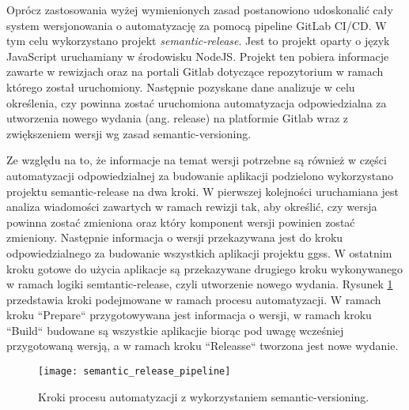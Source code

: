 Oprócz zastosowania wyżej wymienionych zasad postanowiono udoskonalić cały system wersjonowania o automatyzację za pomocą pipeline GitLab CI/CD. W tym celu wykorzystano projekt \emph{semantic-release}. Jest to projekt oparty o język JavaScript uruchamiany w środowisku NodeJS. Projekt ten pobiera informacje zawarte w rewizjach oraz na portali Gitlab dotyczące repozytorium w ramach którego został uruchomiony. Następnie pozyskane dane analizuje w celu określenia, czy powinna zostać uruchomiona automatyzacja odpowiedzialna za utworzenia nowego wydania (ang. release) na platformie Gitlab wraz z zwiększeniem wersji wg zasad semantic-versioning.

Ze względu na to, że informacje na temat wersji potrzebne są również w części automatyzacji odpowiedzialnej za budowanie aplikacji podzielono wykorzystano projektu semantic-release na dwa kroki. W pierwszej kolejności uruchamiana jest analiza wiadomości zawartych w ramach rewizji tak, aby określić, czy wersja powinna zostać zmieniona oraz który komponent wersji powinien zostać zmieniony. Następnie informacja o wersji przekazywana jest do kroku odpowiedzialnego za budowanie wszystkich aplikacji projektu ggss. W ostatnim kroku gotowe do użycia aplikacje są przekazywane drugiego kroku wykonywanego w ramach logiki semtantic-release, czyli utworzenie nowego wydania. Rysunek \ref{fig:semantic_pipeline} przedstawia kroki podejmowane w ramach procesu automatyzacji. W ramach kroku ``Prepare`` przygotowywana jest informacja o wersji, w ramach kroku ``Build`` budowane są wszystkie aplikacjie biorąc pod uwagę wcześniej przygotowaną wersją, a w ramach kroku ``Releasse`` tworzona jest nowe wydanie.

\begin{figure}[H]
    \centering
    \texttt{[image: semantic\_release\_pipeline]}
    \caption{Kroki procesu automatyzacji z wykorzystaniem semantic-versioning.}
    \label{fig:semantic_pipeline}
\end{figure}

